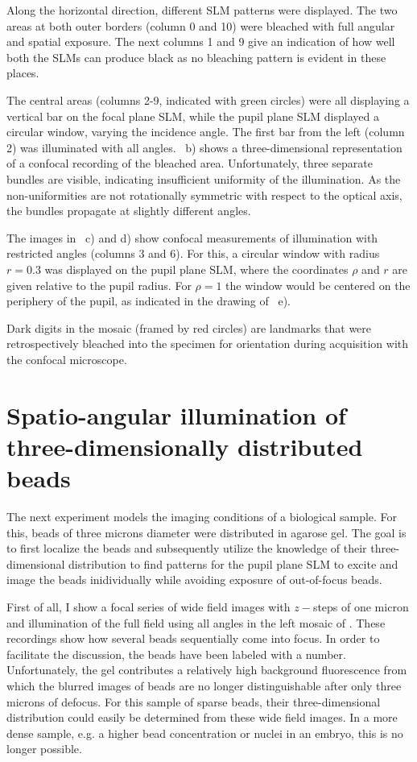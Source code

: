Along the horizontal direction, different SLM patterns were
displayed. The two areas at both outer borders (column 0 and 10) were
bleached with full angular and spatial exposure. The next columns 1
and 9 give an indication of how well both the SLMs can produce black as no
bleaching pattern is evident in these places.

The  central areas (columns 2-9,
indicated with green circles) were all displaying a vertical bar on
the focal plane SLM, while the pupil plane SLM displayed a circular
window, varying the incidence angle. The first bar from the left
(column 2) was illuminated with all
angles. ~b) shows a three-dimensional
representation of a confocal recording of the bleached
area. Unfortunately, three separate bundles are visible, indicating
insufficient uniformity of the illumination.  As the non-uniformities
are not rotationally symmetric with respect to the optical axis, the
bundles propagate at slightly different angles.

The images in ~c) and d) show confocal
measurements of illumination with restricted angles (columns 3 and
6). For this, a circular window with radius $r=0.3$ was displayed on
the pupil plane SLM, where the coordinates $\rho$ and $r$ are given
relative to the pupil radius. For $\rho=1$ the window would be
centered on the periphery of the pupil, as indicated in the drawing
of ~e).

Dark digits in the mosaic (framed by red circles) are landmarks that were
retrospectively bleached into the specimen for orientation during 
acquisition with the confocal microscope.



\section{Spatio-angular illumination of three-dimensionally distributed beads}
\label{sec:beads_under}
The next experiment models the imaging conditions of a biological
sample. For this, beads of three microns diameter were distributed in
agarose gel. The goal is to first localize the beads and subsequently
utilize the knowledge of their three-dimensional distribution to find
patterns for the pupil plane SLM to excite and image the beads
inidividually while avoiding exposure of out-of-focus beads.

First of all,  I show a focal series of wide
field images with $z-$steps of one micron and illumination of the full
field using all angles in the left mosaic of . These
recordings show how several beads sequentially come into focus. In
order to facilitate the discussion, the beads have been labeled with
a number. Unfortunately, the gel contributes a relatively high
background fluorescence from which the blurred images of beads are no
longer distinguishable after only three microns of defocus. For this
sample of sparse beads, their three-dimensional distribution could
easily be determined from these wide field images. In a more dense
sample, e.g. a higher bead concentration or nuclei in an embryo, this
is no longer possible.


